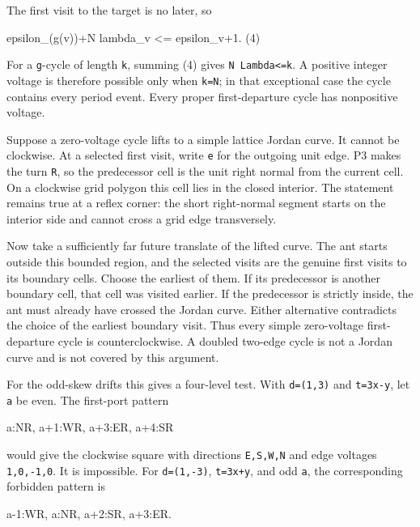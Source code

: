\documentclass[11pt,letterpaper]{article}
\theoremstyle{plain}
\theoremstyle{definition}
\begin{document}
\begin{NoHyper}
The first visit to the target is no later, so

\begin{codeblock}
epsilon_(g(v))+N lambda_v <= epsilon_v+1.             (4)
\end{codeblock}

For a \texttt{g}-cycle of length \texttt{k}, summing (4) gives \texttt{N\ Lambda\textless{}=k}. A positive integer voltage is therefore possible only when \texttt{k=N}; in that exceptional case the cycle contains every period event. Every proper first-departure cycle has nonpositive voltage.

Suppose a zero-voltage cycle lifts to a simple lattice Jordan curve. It cannot be clockwise. At a selected first visit, write \texttt{e} for the outgoing unit edge. P3 makes the turn \texttt{R}, so the predecessor cell is the unit right normal from the current cell. On a clockwise grid polygon this cell lies in the closed interior. The statement remains true at a reflex corner: the short right-normal segment starts on the interior side and cannot cross a grid edge transversely.

Now take a sufficiently far future translate of the lifted curve. The ant starts outside this bounded region, and the selected visits are the genuine first visits to its boundary cells. Choose the earliest of them. If its predecessor is another boundary cell, that cell was visited earlier. If the predecessor is strictly inside, the ant must already have crossed the Jordan curve. Either alternative contradicts the choice of the earliest boundary visit. Thus every simple zero-voltage first-departure cycle is counterclockwise. A doubled two-edge cycle is not a Jordan curve and is not covered by this argument.

For the odd-skew drifts this gives a four-level test. With \texttt{d=(1,3)} and \texttt{t=3x-y}, let \texttt{a} be even. The first-port pattern

\begin{codeblock}
a:NR,       a+1:WR,       a+3:ER,       a+4:SR
\end{codeblock}

would give the clockwise square with directions \texttt{E,S,W,N} and edge voltages \texttt{1,0,-1,0}. It is impossible. For \texttt{d=(1,-3)}, \texttt{t=3x+y}, and odd \texttt{a}, the corresponding forbidden pattern is

\begin{codeblock}
a-1:WR,     a:NR,         a+2:SR,       a+3:ER.
\end{codeblock}


\end{NoHyper}
\end{document}
